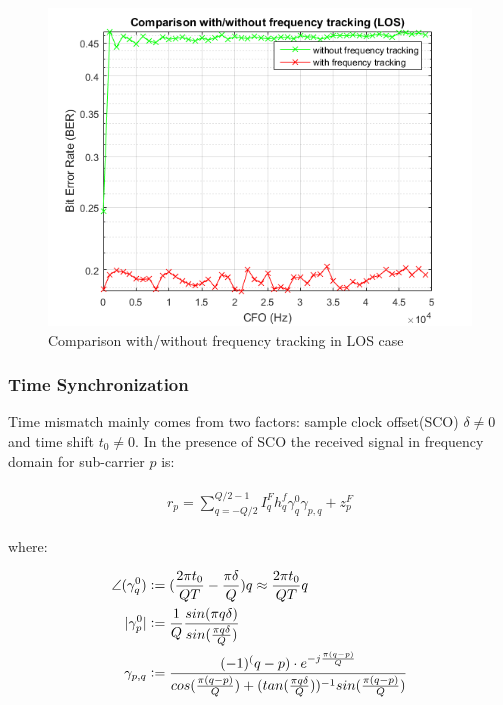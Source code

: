 \documentclass[a4paper]{article}
\begin{document}
        \begin{figure}[h]
		\centering
		\includegraphics[scale=0.6]{figures/CompFAtotal.png}	
		\centering
		\caption{Comparison with/without frequency tracking in LOS case}
		\label{fig:CompFAtotal}
		\end{figure}
    
	\subsubsection{Time Synchronization}
	
	Time mismatch mainly comes from two factors: sample clock offset(SCO) $\delta \neq 0$ and time shift $t_0 \neq 0$. In the presence of SCO the received signal in frequency domain for sub-carrier $p$ is:
	
		\begin{align} 
		\begin{split}
			r_{p} = \sum_{q=-Q/2}^{Q/2-1} I_q^F h^f_q \gamma^0_q \gamma_{p,q} + z_p^F 
		\end{split}
		\label{eq:recev_SCO}
	\end{align}
	
	where:
    
    	\begin{align}
    	\begin{split}
    	\angle (\gamma_q^0) &\vcentcolon= (\frac{2 \pi t_0}{Q T}-\frac{\pi \delta}{Q}) q \approx \frac{2 \pi t_0}{QT} q  \\
        |\gamma^0_p| &\vcentcolon= \frac{1}{Q} \frac{sin(\pi q \delta)}{sin(\frac{\pi q \delta}{Q})}  \\
        \gamma_{p,q} &\vcentcolon= \frac{(-1)^(q-p) \cdot e^{-j\frac{\pi (q-p)}{Q}}}{cos(\frac{\pi (q-p)}{Q}) + (tan(\frac{\pi q \delta}{Q}))^{-1} sin(\frac{\pi (q-p)}{Q})}
    	\end{split}
    	\end{align}
	
\end{document}
